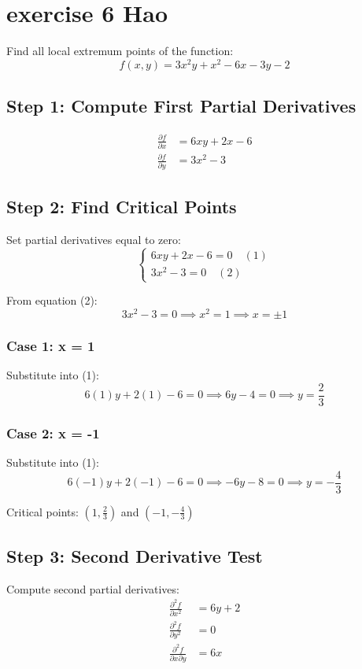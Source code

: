 \documentclass{article}
\begin{document}
\section{exercise 6 Hao}

Find all local extremum points of the function:
\[ f(x,y) = 3x^{2}y + x^{2} - 6x - 3y - 2 \]

\subsection*{Step 1: Compute First Partial Derivatives}
\begin{align*}
    \frac{\partial f}{\partial x} & = 6xy + 2x - 6 \\
    \frac{\partial f}{\partial y} & = 3x^{2} - 3
\end{align*}

\subsection*{Step 2: Find Critical Points}
Set partial derivatives equal to zero:
\[
    \begin{cases}
        6xy + 2x - 6 = 0 \quad (1) \\
        3x^{2} - 3 = 0 \quad (2)
    \end{cases}
\]

From equation (2):
\[ 3x^{2} - 3 = 0 \implies x^{2} = 1 \implies x = \pm 1 \]

\subsubsection*{Case 1: x = 1}
Substitute into (1):
\[ 6(1)y + 2(1) - 6 = 0 \implies 6y - 4 = 0 \implies y = \frac{2}{3} \]

\subsubsection*{Case 2: x = -1}
Substitute into (1):
\[ 6(-1)y + 2(-1) - 6 = 0 \implies -6y - 8 = 0 \implies y = -\frac{4}{3} \]

Critical points: $(1, \frac{2}{3})$ and $(-1, -\frac{4}{3})$

\subsection*{Step 3: Second Derivative Test}
Compute second partial derivatives:
\begin{align*}
    \frac{\partial^{2} f}{\partial x^{2}}        & = 6y + 2 \\
    \frac{\partial^{2} f}{\partial y^{2}}        & = 0      \\
    \frac{\partial^{2} f}{\partial x \partial y} & = 6x
\end{align*}
\end{document}
